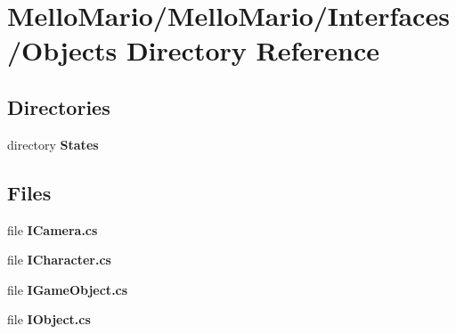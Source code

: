 \section{Mello\+Mario/\+Mello\+Mario/\+Interfaces/\+Objects Directory Reference}
\label{dir_2488024230ef6927c352ecfeba4fb4f3}
\subsection*{Directories}
\begin{DoxyCompactItemize}
\item 
directory \textbf{ States}
\end{DoxyCompactItemize}
\subsection*{Files}
\begin{DoxyCompactItemize}
\item 
file \textbf{ I\+Camera.\+cs}
\item 
file \textbf{ I\+Character.\+cs}
\item 
file \textbf{ I\+Game\+Object.\+cs}
\item 
file \textbf{ I\+Object.\+cs}
\end{DoxyCompactItemize}
